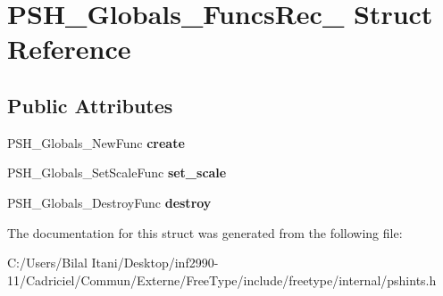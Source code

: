 \hypertarget{struct_p_s_h___globals___funcs_rec__}{}\section{P\+S\+H\+\_\+\+Globals\+\_\+\+Funcs\+Rec\+\_\+ Struct Reference}
\label{struct_p_s_h___globals___funcs_rec__}
\subsection*{Public Attributes}
\begin{DoxyCompactItemize}
\item 
P\+S\+H\+\_\+\+Globals\+\_\+\+New\+Func {\bfseries create}\hypertarget{struct_p_s_h___globals___funcs_rec___ac136cec55ea33a2e3b60ffdad20f5420}{}\label{struct_p_s_h___globals___funcs_rec___ac136cec55ea33a2e3b60ffdad20f5420}

\item 
P\+S\+H\+\_\+\+Globals\+\_\+\+Set\+Scale\+Func {\bfseries set\+\_\+scale}\hypertarget{struct_p_s_h___globals___funcs_rec___a9c97456d3f521cb1091f08c2bda27332}{}\label{struct_p_s_h___globals___funcs_rec___a9c97456d3f521cb1091f08c2bda27332}

\item 
P\+S\+H\+\_\+\+Globals\+\_\+\+Destroy\+Func {\bfseries destroy}\hypertarget{struct_p_s_h___globals___funcs_rec___aebb5534f8305a189b09adfebff4f57ba}{}\label{struct_p_s_h___globals___funcs_rec___aebb5534f8305a189b09adfebff4f57ba}

\end{DoxyCompactItemize}


The documentation for this struct was generated from the following file\+:\begin{DoxyCompactItemize}
\item 
C\+:/\+Users/\+Bilal Itani/\+Desktop/inf2990-\/11/\+Cadriciel/\+Commun/\+Externe/\+Free\+Type/include/freetype/internal/pshints.\+h\end{DoxyCompactItemize}
